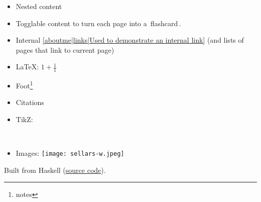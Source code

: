 \begin{itemize}
\item Nested content
\item Togglable content to turn each page into a \,flashcard\,.
\item Internal \ref{aboutme|links|Used to demonstrate an internal link} (and lists of pages that link to current page)
\item \LaTeX: $1+\frac{1}{1}$
\item Foot\footnote{notes}
\item Citations \cite{mazieres2005get}
\item TikZ: \
\item Images: \texttt{[image: sellars-w.jpeg]}

\end{itemize}

Built from Haskell (\href{https://github.com/kris-brown/KBKB}{source code}).
